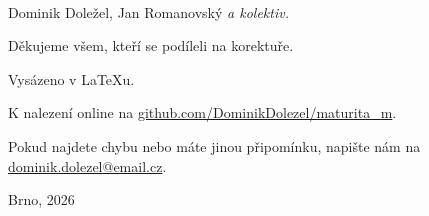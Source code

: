 \thispagestyle{fancy-blank}
\,
\vfill
{\huge\bfseries\utitle\par}
\vspace{5mm}
{\Large Dominik Doležel, Jan Romanovský} \textit{a kolektiv.}\par
\vspace{10mm}
Děkujeme všem, kteří se podíleli na korektuře. \par
Vysázeno v \LaTeX u.\par
K nalezení online na \href{https://github.com/DominikDolezel/maturita_m}{github.com/DominikDolezel/maturita\_m}.\par
Pokud najdete chybu nebo máte jinou připomínku, napište nám na \href{mailto:dominik.dolezel@email.cz}{dominik.dolezel@email.cz}. \par
Brno, 2026
\clearpage
